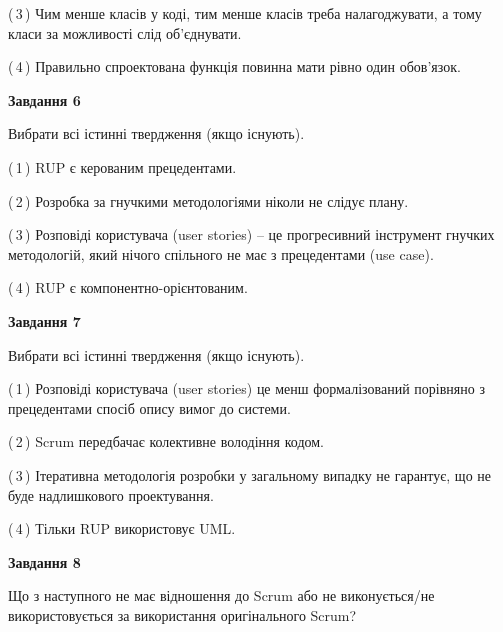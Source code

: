 \documentclass[10pt, ukrainian]{article}
\begin{document}
{\begin {large}
(\,3\,) Чим менше класів у коді, тим менше класів треба налагоджувати, а тому класи за можливості слід об'єднувати. %



(\,4\,) Правильно спроектована функція повинна мати рівно один обов'язок. %

\newpage

{\begin {center}\textbf{Завдання 6}\end {center}}\par
Вибрати всі істинні твердження (якщо існують).\par
\vspace{2mm}



(\,1\,) RUP є керованим прецедентами. %



(\,2\,) Розробка за гнучкими методологіями ніколи не слідує плану. %



(\,3\,) Розповіді користувача (user stories) – це прогресивний інструмент гнучких методологій, який нічого спільного не має з прецедентами (use case). %



(\,4\,) RUP є компонентно-орієнтованим. %


{\begin {center}\textbf{Завдання 7}\end {center}}\par
Вибрати всі істинні твердження (якщо існують).\par
\vspace{2mm}



(\,1\,) Розповіді користувача (user stories) це менш формалізований порівняно з прецедентами спосіб опису вимог до системи. %



(\,2\,) Scrum передбачає колективне володіння кодом. %



(\,3\,) Ітеративна методологія розробки у загальному випадку не гарантує, що не буде надлишкового проектування. %



(\,4\,) Тільки RUP використовує UML.%


{\begin {center}\textbf{Завдання 8}\end {center}}\par
Що з наступного не має відношення до Scrum або не виконується/не використовується за використання оригінального Scrum?\par
\vspace{2mm}




\end{large}}
\end{document}
